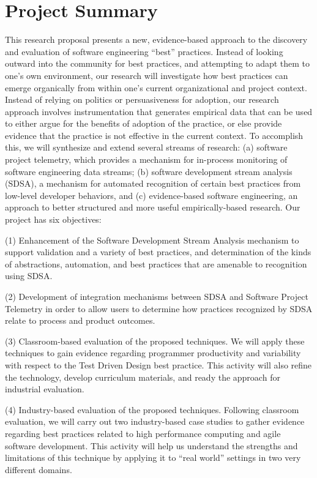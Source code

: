 \documentclass[11pt]{article}
\begin{document}
\section*{Project Summary}

This research proposal presents a new, evidence-based approach to the
discovery and evaluation of software engineering ``best'' practices.
Instead of looking outward into the community for best practices, and
attempting to adapt them to one's own environment, our research will
investigate how best practices can emerge organically from within one's
current organizational and project context.  Instead of relying on politics
or persuasiveness for adoption, our research approach involves
instrumentation that generates empirical data that can be used to either
argue for the benefits of adoption of the practice, or else provide
evidence that the practice is not effective in the current
context.  To accomplish this, we will synthesize and extend several streams
of research: (a) software project telemetry, which provides a mechanism for
in-process monitoring of software engineering data streams; (b) software
development stream analysis (SDSA), a mechanism for automated recognition
of certain best practices from low-level developer behaviors, and (c)
evidence-based software engineering, an approach to better structured and
more useful empirically-based research.  Our project has six objectives:

  
(1) Enhancement of the Software Development Stream Analysis mechanism to
  support validation and a variety of best practices, and determination of the
  kinds of abstractions, automation, and best practices that are amenable
  to recognition using SDSA.

(2) Development of integration mechanisms between SDSA and Software
  Project Telemetry in order to allow users to determine how practices
  recognized by SDSA relate to process and product outcomes. 
  
  
(3) Classroom-based evaluation of the proposed techniques. We will 
apply these techniques to gain evidence regarding programmer productivity and variability 
with respect to the Test Driven Design best practice. This activity will also 
refine the technology, develop curriculum materials, and ready the approach for 
industrial evaluation. 

(4) Industry-based evaluation of the proposed techniques. Following
classroom evaluation, we will carry out two industry-based case studies to
gather evidence regarding best practices related to high performance
computing and agile software development. This activity will help us
understand the strengths and limitations of this technique by applying it
to ``real world'' settings in two very different domains.
  
\end{document}
